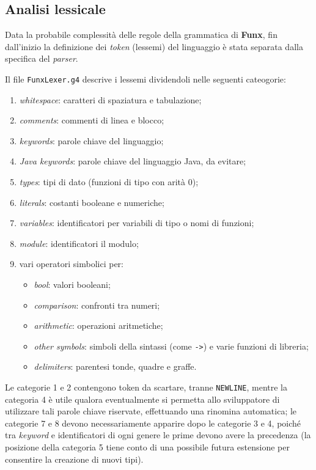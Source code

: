 \subsection{Analisi lessicale}
\label{sec:5-2-lexical-analysis}

Data la probabile complessità delle regole della grammatica di \textbf{Funx}, fin dall'inizio la definizione dei \textit{token} (lessemi)
del linguaggio è stata separata dalla specifica del \textit{parser}.

\noindent Il file \texttt{FunxLexer.g4} descrive i lessemi dividendoli nelle seguenti cateogorie:
\begin{enumerate}
    \item \textit{whitespace}: caratteri di spaziatura e tabulazione;
    \item \textit{comments}: commenti di linea e blocco;
    \item \textit{keywords}: parole chiave del linguaggio;
    \item \textit{Java keywords}: parole chiave del linguaggio Java, da evitare;
    \item \textit{types}: tipi di dato (funzioni di tipo con arità 0);
    \item \textit{literals}: costanti booleane e numeriche;
    \item \textit{variables}: identificatori per variabili di tipo o nomi di funzioni;
    \item \textit{module}: identificatori il modulo;
    \item vari operatori simbolici per:
          \begin{itemize}
              \item \textit{bool}: valori booleani;
              \item \textit{comparison}: confronti tra numeri;
              \item \textit{arithmetic}: operazioni aritmetiche;
              \item \textit{other symbols}: simboli della sintassi (come \texttt{->}) e varie funzioni di libreria;
              \item \textit{delimiters}: parentesi tonde, quadre e graffe.
          \end{itemize}
\end{enumerate}

\noindent Le categorie 1 e 2 contengono token da scartare, tranne \texttt{NEWLINE}, mentre la categoria 4 è utile
qualora eventualmente si permetta allo sviluppatore di utilizzare tali parole chiave riservate,
effettuando una rinomina automatica; le categorie 7 e 8 devono necessariamente apparire dopo le categorie 3 e 4,
poiché tra \textit{keyword} e identificatori di ogni genere le prime devono avere la precedenza
(la posizione della categoria 5 tiene conto di una possibile futura estensione per consentire la creazione di nuovi tipi).



